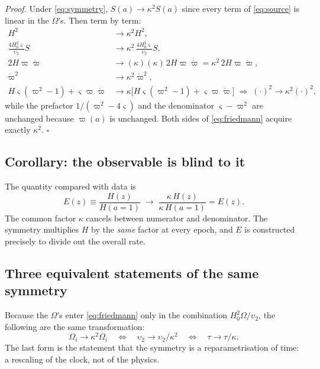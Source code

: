 \documentclass[11pt]{article}
\newcommand{\ups}{\upsilon_2}
\begin{document}
\noindent\emph{Proof.} Under \eqref{eq:symmetry}, $S(a)\to \kappa^2S(a)$ since every
term of \eqref{eq:source} is linear in the $\Omega$'s. Then term by term:
\begin{align*}
H^2 &\to \kappa^2H^2, \\
\frac{4H_0^2\varsigma}{\ups}S &\to \kappa^2\,\frac{4H_0^2\varsigma}{\ups}S, \\
2H\varpi\dot\varpi &\to (\kappa)(\kappa)\,2H\varpi\dot\varpi = \kappa^2\,2H\varpi\dot\varpi, \\
\dot\varpi^2 &\to \kappa^2\dot\varpi^2, \\
H\varsigma(\varpi^2-1)+\varsigma\varpi\dot\varpi
 &\to \kappa\big[H\varsigma(\varpi^2-1)+\varsigma\varpi\dot\varpi\big]
 \;\Longrightarrow\; (\cdot)^2 \to \kappa^2(\cdot)^2 ,
\end{align*}
while the prefactor $1/(\varpi^2-4\varsigma)$ and the denominator
$\varsigma-\varpi^2$ are unchanged because $\varpi(a)$ is unchanged. Both sides
of \eqref{eq:friedmann} acquire exactly $\kappa^2$. $\square$

\subsection{Corollary: the observable is blind to it}

The quantity compared with data is
\begin{equation}
E(z) \equiv \frac{H(z)}{H(a{=}1)}
 \;\longrightarrow\; \frac{\kappa\,H(z)}{\kappa\,H(a{=}1)} = E(z).
\end{equation}
The common factor $\kappa$ cancels between numerator and denominator. The symmetry
multiplies $H$ by the \emph{same} factor at every epoch, and $E$ is constructed
precisely to divide out the overall rate.

\subsection{Three equivalent statements of the same symmetry}

Because the $\Omega$'s enter \eqref{eq:friedmann} only in the combination
$H_0^2\Omega/\ups$, the following are the same transformation:
\begin{equation}
\Omega_i \to \kappa^2\Omega_i
\quad\Longleftrightarrow\quad
\ups \to \ups/\kappa^2
\quad\Longleftrightarrow\quad
\tau \to \tau/\kappa .
\label{eq:three}
\end{equation}
The last form is the statement that the symmetry is a reparametrisation of
time: a rescaling of the clock, not of the physics.
\end{document}
